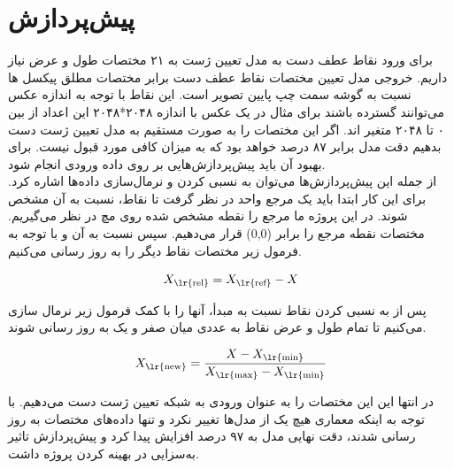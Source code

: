 \section{پیش‌پردازش}
برای ورود نقاط عطف دست به مدل تعیین ژست به ۲۱ مختصات طول و عرض نیاز داریم. خروجی مدل تعیین مختصات نقاط عطف دست برابر مختصات مطلق پیکسل ها نسبت به گوشه سمت 
چپ پایین تصویر است. این نقاط با توجه به اندازه عکس می‌توانند گسترده باشند برای مثال در یک عکس با اندازه ۲۰۴۸*۲۰۴۸ این اعداد از بین ۰ تا ۲۰۴۸ متغیر اند. 
اگر این مختصات را به صورت مستقیم به مدل تعیین ژست دست بدهیم دقت مدل برابر ۸۷ درصد خواهد بود که به میزان کافی مورد قبول نیست. برای بهبود آن باید پیش‌پردازش‌هایی بر روی داده ورودی انجام شود. 
\\
از جمله این پیش‌پردازش‌ها می‌توان به نسبی کردن و نرمال‌سازی داده‌ها اشاره کرد. برای این کار ابتدا باید یک مرجع واحد در نظر گرفت تا نقاط، نسبت به آن مشخص شوند. در این پروژه ما مرجع را نقطه 
مشخص شده روی مچ در نظر می‌گیریم. مختصات نقطه مرجع را برابر (0,0)  قرار می‌دهیم. سپس نسبت به آن و با توجه به فرمول زیر مختصات نقاط دیگر را به روز رسانی می‌کنیم.

\[ X_{\text{\lr{rel}}} = X_{\text{\lr{ref}}} - X \]


پس از به نسبی کردن نقاط نسبت به مبدأ، آنها را با کمک فرمول زیر نرمال سازی می‌کنیم تا تمام طول و عرض نقاط به عددی میان صفر و یک به روز رسانی شوند.

\[ X_{\text{\lr{new}}} = \frac{X - X_{\text{\lr{min}}}}{X_{\text{\lr{max}}} - X_{\text{\lr{min}}}} \]

در انتها این این مختصات را به عنوان ورودی به شبکه تعیین ژست دست می‌دهیم. با توجه به اینکه معماری هیچ یک از مدل‌ها تغییر نکرد و تنها داده‌های مختصات به روز رسانی شدند، 
دقت نهایی مدل به ۹۷ درصد افزایش پیدا کرد و پیش‌پردازش تاثیر به‌سزایی در بهینه کردن پروژه داشت.



